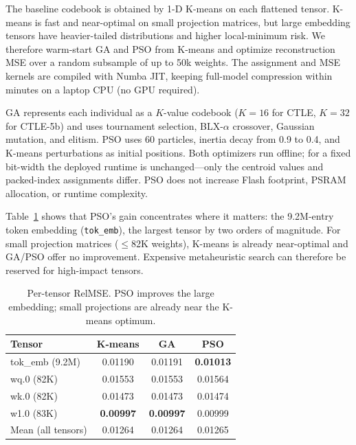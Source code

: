 \documentclass[10pt,journal]{IEEEtran}
\begin{document}
The baseline codebook is obtained by 1-D K-means on each flattened tensor.
K-means is fast and near-optimal on small projection matrices, but large
embedding tensors have heavier-tailed distributions and higher local-minimum
risk. We therefore warm-start GA and PSO from K-means and optimize
reconstruction MSE over a random subsample of up to 50k weights. The assignment
and MSE kernels are compiled with Numba JIT, keeping full-model compression
within minutes on a laptop CPU (no GPU required).

GA represents each individual as a $K$-value codebook ($K\!=\!16$ for CTLE,
$K\!=\!32$ for CTLE-5b) and uses tournament selection, BLX-$\alpha$ crossover,
Gaussian mutation, and elitism. PSO uses 60 particles, inertia decay from 0.9
to 0.4, and K-means perturbations as initial positions. Both optimizers run
offline; for a fixed bit-width the deployed runtime is unchanged---only the
centroid values and packed-index assignments differ. PSO does not increase
Flash footprint, PSRAM allocation, or runtime complexity.

Table~\ref{tab:relmse_esl} shows that PSO's gain concentrates where it matters:
the 9.2M-entry token embedding (\texttt{tok\_emb}), the largest tensor by two
orders of magnitude. For small projection matrices ($\leq$82K weights), K-means
is already near-optimal and GA/PSO offer no improvement. Expensive metaheuristic
search can therefore be reserved for high-impact tensors.

\begin{table}[t]
\centering
\footnotesize
\caption{Per-tensor RelMSE. PSO improves the large embedding; small projections
are already near the K-means optimum.}
\label{tab:relmse_esl}
\setlength{\tabcolsep}{4pt}
\renewcommand{\arraystretch}{1.12}
\begin{tabular}{lccc}
\hline
Tensor & K-means & GA & PSO \\
\hline
tok\_emb (9.2M) & 0.01190 & 0.01191 & \textbf{0.01013} \\
wq.0 (82K) & 0.01553 & 0.01553 & 0.01564 \\
wk.0 (82K) & 0.01473 & 0.01473 & 0.01474 \\
w1.0 (83K) & \textbf{0.00997} & \textbf{0.00997} & 0.00999 \\
Mean (all tensors) & 0.01264 & 0.01264 & 0.01265 \\
\hline
\end{tabular}
\end{table}


\end{document}
